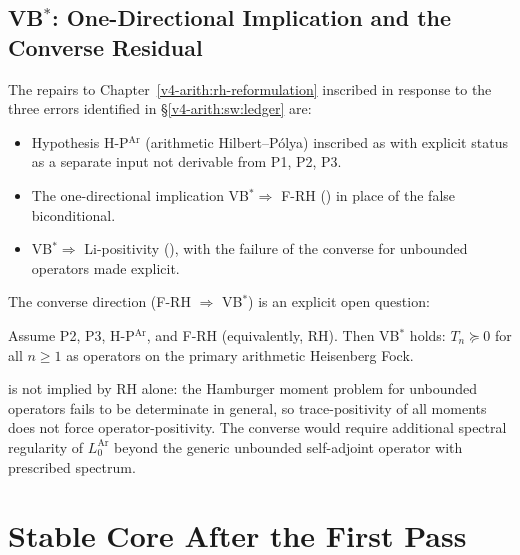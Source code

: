 \subsection{\texorpdfstring{VB\(^{*}\)}{VB*}: One-Directional Implication and the Converse Residual}

The repairs to Chapter~\ref{v4-arith:rh-reformulation} inscribed
in response to the three errors identified in
\S\ref{v4-arith:sw:ledger} are:
\begin{itemize}
\item Hypothesis H-P\(^{\mathrm{Ar}}\) (arithmetic Hilbert--P\'olya)
inscribed as  with explicit status as a
separate input not derivable from P1, P2, P3.
\item The one-directional implication VB\(^{*}\Rightarrow\) F-RH
() in place of the false
biconditional.
\item VB\(^{*}\Rightarrow\) Li-positivity
(), with the failure of the
converse for unbounded operators made explicit.
\end{itemize}

The converse direction (F-RH \(\Rightarrow\) VB\(^{*}\)) is an
explicit open question:

\begin{conjecture}[VB\(^{*}\) converse]
\label{v4-arith:sw:conj:VB-converse}
Assume P2, P3, H-P\(^{\mathrm{Ar}}\), and F-RH (equivalently, RH).
Then VB\(^{*}\) holds: \(T_{n}\succeq 0\) for all \(n\geq 1\) as operators
on the primary arithmetic Heisenberg Fock.
\end{conjecture}

\begin{remark}
\label{v4-arith:sw:rem:VB-converse-finer}
 is not implied by RH alone:
the Hamburger moment problem for unbounded operators fails to be
determinate in general, so trace-positivity of all moments does
not force operator-positivity. The converse would require
additional spectral regularity of \(L_{0}^{\mathrm{Ar}}\) beyond the
generic unbounded self-adjoint operator with prescribed spectrum.
\end{remark}

\section{Stable Core After the First Pass}
\label{v4-arith:sw:post-catalog}

